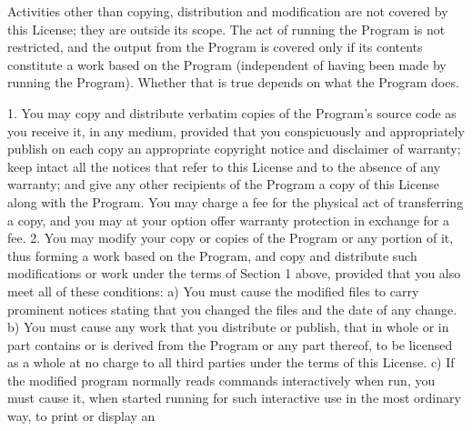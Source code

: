 \begin{DoxyCodeInclude}
Activities other than copying, distribution and modification are not
covered by \textcolor{keyword}{this} License; they are outside its scope.  The act of
running the Program is not restricted, and the output from the Program
is covered only \textcolor{keywordflow}{if} its contents constitute a work based on the
Program (independent of having been made by running the Program).
Whether that is \textcolor{keyword}{true} depends on what the Program does.

  1. You may copy and distribute verbatim copies of the Program\textcolor{stringliteral}{'s}
\textcolor{stringliteral}{source code as you receive it, in any medium, provided that you}
\textcolor{stringliteral}{conspicuously and appropriately publish on each copy an appropriate}
\textcolor{stringliteral}{copyright notice and disclaimer of warranty; keep intact all the}
\textcolor{stringliteral}{notices that refer to this License and to the absence of any warranty;}
\textcolor{stringliteral}{and give any other recipients of the Program a copy of this License}
\textcolor{stringliteral}{along with the Program.}
\textcolor{stringliteral}{}
\textcolor{stringliteral}{You may charge a fee for the physical act of transferring a copy, and}
\textcolor{stringliteral}{you may at your option offer warranty protection in exchange for a fee.}
\textcolor{stringliteral}{}
\textcolor{stringliteral}{  2. You may modify your copy or copies of the Program or any portion}
\textcolor{stringliteral}{of it, thus forming a work based on the Program, and copy and}
\textcolor{stringliteral}{distribute such modifications or work under the terms of Section 1}
\textcolor{stringliteral}{above, provided that you also meet all of these conditions:}
\textcolor{stringliteral}{}
\textcolor{stringliteral}{    a) You must cause the modified files to carry prominent notices}
\textcolor{stringliteral}{    stating that you changed the files and the date of any change.}
\textcolor{stringliteral}{}
\textcolor{stringliteral}{    b) You must cause any work that you distribute or publish, that in}
\textcolor{stringliteral}{    whole or in part contains or is derived from the Program or any}
\textcolor{stringliteral}{    part thereof, to be licensed as a whole at no charge to all third}
\textcolor{stringliteral}{    parties under the terms of this License.}
\textcolor{stringliteral}{}
\textcolor{stringliteral}{    c) If the modified program normally reads commands interactively}
\textcolor{stringliteral}{    when run, you must cause it, when started running for such}
\textcolor{stringliteral}{    interactive use in the most ordinary way, to print or display an}

\end{DoxyCodeInclude}
